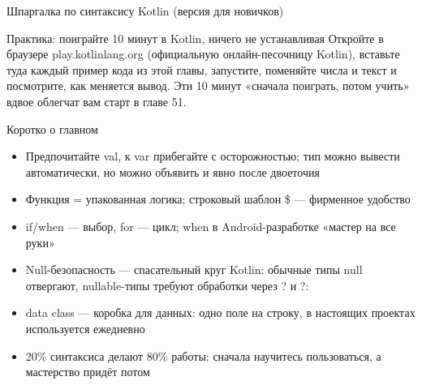 \begin{center}\small\color{gray}Шпаргалка по синтаксису Kotlin (версия для новичков)\end{center}

\begin{tcbpractice}{Практика: поиграйте 10 минут в Kotlin, ничего не устанавливая}
Откройте в браузере play.kotlinlang.org (официальную онлайн-песочницу Kotlin), вставьте туда каждый пример кода из этой главы, запустите, поменяйте числа и текст и посмотрите, как меняется вывод. Эти 10 минут «сначала поиграть, потом учить» вдвое облегчат вам старт в главе 51.

\end{tcbpractice}

\begin{tcbsummary}{Коротко о главном}
\begin{itemize}
  \item Предпочитайте val, к var прибегайте с осторожностью; тип можно вывести автоматически, но можно объявить и явно после двоеточия
  \item Функция = упакованная логика; строковый шаблон \$ — фирменное удобство
  \item if/when — выбор, for — цикл; when в Android-разработке «мастер на все руки»
  \item Null-безопасность — спасательный круг Kotlin: обычные типы null отвергают, nullable-типы требуют обработки через ? и ?:
  \item data class — коробка для данных: одно поле на строку, в настоящих проектах используется ежедневно
  \item 20\% синтаксиса делают 80\% работы: сначала научитесь пользоваться, а мастерство придёт потом
\end{itemize}

\end{tcbsummary}

